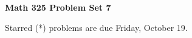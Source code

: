 \documentclass[12pt]{article}
\begin{document}
\def\ctln{\centerline}
\def\msk{\medskip}
\def\bsk{\bigskip}
\def\ssk{\smallskip}
\def\hsk{\hskip.3in}
\def\ra{\rightarrow}
\def\ubr{\underbar}
\def\dsp{\displaystyle}

\def\mt{{\mathcal T}}
\def\mb{{\mathcal B}}
\def\ms{{\mathcal S}}
\def\mu{{\mathcal U}}
\def\mv{{\mathcal V}}

\def\bbr{{\mathbb R}}
\def\bbz{{\mathbb Z}}
\def\bbq{{\mathbb Q}}
\def\bbn{{\mathbb N}}
\def\spc{$~$\hskip.15in$~$}

\def\sset{\subseteq}
\def\del{\partial}
\def\lra{$\Leftrightarrow$}
\def\bra{$\Rightarrow$}




\ctln{\bf Math 325 Problem Set 7}

\msk

\ctln{Starred (*) problems are due Friday, October 19.}
\end{document}
